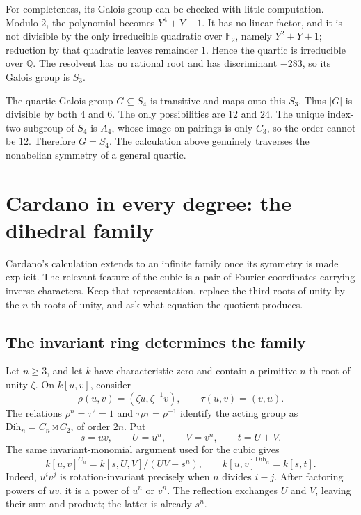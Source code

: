 \documentclass[11pt]{article}
\theoremstyle{remark}
\newcommand{\Q}{\mathbb Q}
\begin{document}
For completeness, its Galois group can be checked with little computation. Modulo \(2\), the polynomial becomes \(Y^4+Y+1\). It has no linear factor, and it is not divisible by the only irreducible quadratic over \(\mathbb F_2\), namely \(Y^2+Y+1\); reduction by that quadratic leaves remainder \(1\). Hence the quartic is irreducible over \(\Q\). The resolvent has no rational root and has discriminant \(-283\), so its Galois group is \(S_3\).

The quartic Galois group \(G\subseteq S_4\) is transitive and maps onto this \(S_3\). Thus \(|G|\) is divisible by both \(4\) and \(6\). The only possibilities are \(12\) and \(24\). The unique index-two subgroup of \(S_4\) is \(A_4\), whose image on pairings is only \(C_3\), so the order cannot be \(12\). Therefore \(G=S_4\). The calculation above genuinely traverses the nonabelian symmetry of a general quartic.

\section{Cardano in every degree: the dihedral family}
\label{dihedral:section}

Cardano's calculation extends to an infinite family once its symmetry is made explicit. The relevant feature of the cubic is a pair of Fourier coordinates carrying inverse characters. Keep that representation, replace the third roots of unity by the \(n\)-th roots of unity, and ask what equation the quotient produces.

\subsection{The invariant ring determines the family}

Let \(n\geq3\), and let \(k\) have characteristic zero and contain a primitive \(n\)-th root of unity \(\zeta\). On \(k[u,v]\), consider
\[
\rho(u,v)=(\zeta u,\zeta^{-1}v),
\qquad
\tau(u,v)=(v,u).
\]
The relations \(\rho^n=\tau^2=1\) and \(\tau\rho\tau=\rho^{-1}\) identify the acting group as \(\mathrm{Dih}_n=C_n\rtimes C_2\), of order \(2n\). Put
\[
s=uv,\qquad U=u^n,\qquad V=v^n,\qquad t=U+V.
\]
The same invariant-monomial argument used for the cubic gives
\begin{equation}
k[u,v]^{C_n}=k[s,U,V]/(UV-s^n),
\qquad
k[u,v]^{\mathrm{Dih}_n}=k[s,t].
\label{dihedral:invariants}
\end{equation}
Indeed, \(u^iv^j\) is rotation-invariant precisely when \(n\) divides \(i-j\). After factoring powers of \(uv\), it is a power of \(u^n\) or \(v^n\). The reflection exchanges \(U\) and \(V\), leaving their sum and product; the latter is already \(s^n\).
\end{document}
